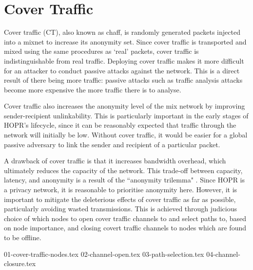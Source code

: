 \section{Cover Traffic}
\label{sec:ct}

Cover traffic (CT), also known as chaff, is randomly generated packets injected into a mixnet to increase its anonymity set. Since cover traffic is transported and mixed using the same procedures as `real' packets, cover traffic is indistinguishable from real traffic. Deploying cover traffic makes it more difficult for an attacker to conduct passive attacks against the network. This is a direct result of there being more traffic: passive attacks such as traffic analysis attacks become more expensive the more traffic there is to analyse.

Cover traffic also increases the anonymity level of the mix network by improving sender-recipient unlinkability. This is particularly important in the early stages of HOPR's lifecycle, since it can be reasonably expected that traffic through the network will initially be low. Without cover traffic, it would be easier for a global passive adversary to link the sender and recipient of a particular packet.

A drawback of cover traffic is that it increases bandwidth overhead, which ultimately reduces the capacity of the network. This trade-off between capacity, latency, and anonymity is a result of the ``anonymity trilemma" \cite{AnonymityTrilemma}. Since HOPR is a privacy network, it is reasonable to prioritise anonymity here. However, it is important to mitigate the deleterious effects of cover traffic as far as possible, particularly avoiding wasted transmissions. This is achieved through judicious choice of which nodes to open cover traffic channels to and select paths to, based on node importance, and closing covert traffic channels to nodes which are found to be offline. 

{01-cover-traffic-nodes.tex}
{02-channel-open.tex}
{03-path-selection.tex}
{04-channel-closure.tex}